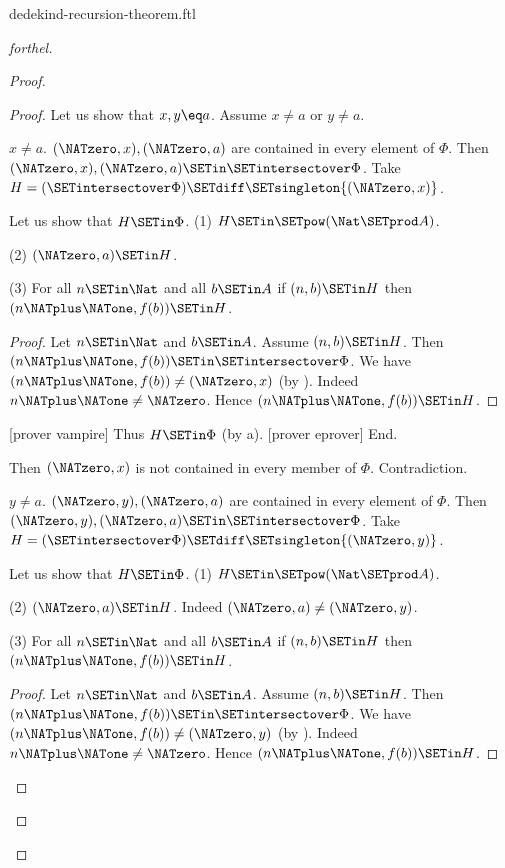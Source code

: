 \documentclass{naproche-library}
\begin{document}
\begin{smodule}[title=Dedekind's Recursion Theorem]{dedekind-recursion-theorem.ftl}
\begin{proof}[forthel]
\begin{proof}
\begin{proof}
        Let us show that $x, y \eq a$.
          Assume $x \neq a$ or $y \neq a$.

          \begin{case}{$x \neq a$.}
            $(\NATzero,x), (\NATzero,a)$ are contained in every element of $\Phi$.
            Then $(\NATzero,x), (\NATzero,a) \SETin \SETintersectover \Phi$.
            Take $H = (\SETintersectover \Phi) \SETdiff \SETsingleton{(\NATzero,x)}$.

            Let us show that $H \SETin \Phi$.
              (1) $H \SETin \SETpow(\Nat \SETprod A)$.

              (2) $(\NATzero,a) \SETin H$.

              (3) For all $n \SETin \Nat$ and all $b \SETin A$ if
              $(n,b) \SETin H$ then $(n \NATplus \NATone, f(b)) \SETin H$.
              \begin{proof}
                Let $n \SETin \Nat$ and $b \SETin A$.
                Assume $(n,b) \SETin H$.
                Then $(n \NATplus \NATone, f(b)) \SETin \SETintersectover \Phi$.
                We have $(n \NATplus \NATone, f(b)) \neq (\NATzero,x)$ (by ).
                Indeed $n \NATplus \NATone \neq \NATzero$.
                Hence $(n \NATplus \NATone, f(b)) \SETin H$.
              \end{proof}

              [prover vampire]
              Thus $H \SETin \Phi$ (by a).
              [prover eprover]
            End.

            Then $(\NATzero,x)$ is not contained in every member of $\Phi$.
            Contradiction.
          \end{case}

          \begin{case}{$y \neq a$.}
            $(\NATzero,y), (\NATzero,a)$ are contained in every element of $\Phi$.
            Then $(\NATzero,y), (\NATzero,a) \SETin \SETintersectover \Phi$.
            Take $H = (\SETintersectover \Phi) \SETdiff \SETsingleton{(\NATzero,y)}$.

            Let us show that $H \SETin \Phi$.
              (1) $H \SETin \SETpow(\Nat \SETprod A)$.

              (2) $(\NATzero,a) \SETin H$.
              Indeed $(\NATzero,a) \neq (\NATzero,y)$.

              (3) For all $n \SETin \Nat$ and all $b \SETin A$ if
              $(n,b) \SETin H$ then $(n \NATplus \NATone, f(b)) \SETin H$.
              \begin{proof}
                Let $n \SETin \Nat$ and $b \SETin A$.
                Assume $(n,b) \SETin H$.
                Then $(n \NATplus \NATone, f(b)) \SETin \SETintersectover \Phi$.
                We have $(n \NATplus \NATone, f(b)) \neq (\NATzero,y)$ (by ).
                Indeed $n \NATplus \NATone \neq \NATzero$.
                Hence $(n \NATplus \NATone, f(b)) \SETin H$.
              \end{proof}


\end{case}
\end{proof}
\end{proof}
\end{proof}
\end{smodule}
\end{document}

